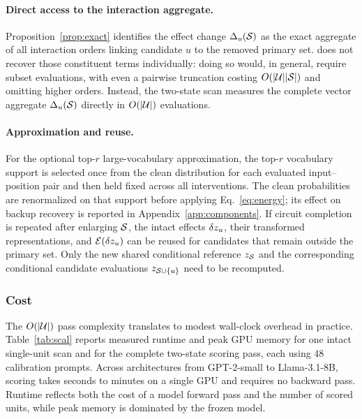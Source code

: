 \paragraph{Direct access to the interaction aggregate.}
Proposition~\ref{prop:exact} identifies the effect change
$\Delta_u(\mathcal{S})$ as the exact aggregate of all interaction orders linking
candidate $u$ to the removed primary set.
\coax does not recover those constituent terms individually: doing so would, in general, require subset evaluations, with even a pairwise truncation costing $O(|\mathcal{U}||\mathcal{S}|)$ and omitting higher orders.
Instead, the two-state scan measures the complete vector aggregate $\Delta_u(\mathcal{S})$ directly in $O(|\mathcal{U}|)$ evaluations.

\paragraph{Approximation and reuse.}
For the optional top-$r$ large-vocabulary approximation, the top-$r$
vocabulary support is selected once from the clean distribution for each
evaluated input--position pair and then held fixed across all interventions.
The clean probabilities are renormalized on that support before applying
Eq.~\ref{eq:energy}; its effect on backup recovery is reported in
Appendix~\ref{app:components}.
If circuit completion is repeated after enlarging $\mathcal{S}$, the intact effects
$\delta z_u$, their transformed representations, and $\mathcal{E}(\delta z_u)$ can be reused
for candidates that remain outside the primary set.
Only the new shared conditional reference $z_{\mathcal{S}}$ and the corresponding
conditional candidate evaluations $z_{\mathcal{S}\cup\{u\}}$ need to be recomputed.

\subsubsection{Cost}

The $O(|\mathcal{U}|)$ pass complexity translates to modest wall-clock overhead in
practice.
Table~\ref{tab:scal} reports measured runtime and peak GPU memory for one
intact single-unit scan and for the complete two-state \coax scoring pass, each using $48$ calibration prompts.
Across architectures from GPT-2-small to Llama-3.1-8B, scoring takes seconds to
minutes on a single GPU and requires no backward pass.
Runtime reflects both the cost of a model forward pass and the number of scored
units, while peak memory is dominated by the frozen model.

